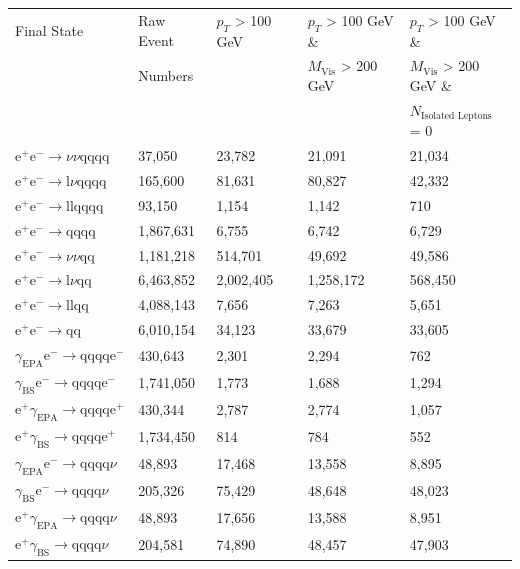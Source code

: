 \begin{table}[h!]
\centering
\begin{tabular}{ l l l l l}
\hline
Final State & Raw Event  & $p_{T}$ > 100 GeV & $p_{T}$ > 100 GeV \& & $p_{T}$ > 100 GeV \& \\ 
& Numbers & & $M_{\text{Vis}}$ > 200 GeV & $M_{\text{Vis}}$ > 200 GeV \&\\ 
& & & & $N_{\text{Isolated Leptons}}$ = 0\\ 
\hline
$\text{e}^{+}\text{e}^{-} \rightarrow \nu{\nu}\text{qqqq}$ & 37,050 & 23,782 & 21,091 & 21,034 \\
$\text{e}^{+}\text{e}^{-} \rightarrow \text{l}\nu\text{qqqq}$ & 165,600 & 81,631 & 80,827 & 42,332 \\
$\text{e}^{+}\text{e}^{-} \rightarrow \text{llqqqq}$ & 93,150 & 1,154 & 1,142 & 710 \\
$\text{e}^{+}\text{e}^{-} \rightarrow \text{qqqq}$ & 1,867,631 & 6,755 & 6,742 & 6,729 \\
$\text{e}^{+}\text{e}^{-} \rightarrow \nu{\nu}\text{qq}$ & 1,181,218 & 514,701 & 49,692 & 49,586 \\
$\text{e}^{+}\text{e}^{-} \rightarrow \text{l}\nu\text{qq}$ & 6,463,852 & 2,002,405 & 1,258,172 & 568,450 \\
$\text{e}^{+}\text{e}^{-} \rightarrow \text{llqq}$ & 4,088,143 & 7,656 & 7,263 & 5,651 \\
$\text{e}^{+}\text{e}^{-} \rightarrow \text{qq}$ & 6,010,154 & 34,123 & 33,679 & 33,605 \\
$\gamma_{\text{EPA}}\text{e}^{-} \rightarrow \text{qqqq}\text{e}^{-}$ & 430,643 & 2,301 & 2,294 & 762 \\
$\gamma_{\text{BS}}\text{e}^{-} \rightarrow \text{qqqq}\text{e}^{-}$ & 1,741,050 & 1,773 & 1,688 & 1,294 \\
$\text{e}^{+}\gamma_{\text{EPA}} \rightarrow \text{qqqq}\text{e}^{+}$ & 430,344 & 2,787 & 2,774 & 1,057 \\
$\text{e}^{+}\gamma_{\text{BS}} \rightarrow \text{qqqq}\text{e}^{+}$ & 1,734,450 & 814 & 784 & 552 \\
$\gamma_{\text{EPA}}\text{e}^{-} \rightarrow \text{qqqq}\nu$ & 48,893 & 17,468 & 13,558 & 8,895 \\
$\gamma_{\text{BS}}\text{e}^{-} \rightarrow \text{qqqq}\nu$ & 205,326 & 75,429 & 48,648 & 48,023 \\
$\text{e}^{+}\gamma_{\text{EPA}} \rightarrow \text{qqqq}\nu$ & 48,893 & 17,656 & 13,588 & 8,951 \\
$\text{e}^{+}\gamma_{\text{BS}} \rightarrow \text{qqqq}\nu$ & 204,581 & 74,890 & 48,457 & 47,903 \\

\end{tabular}
\end{table}
